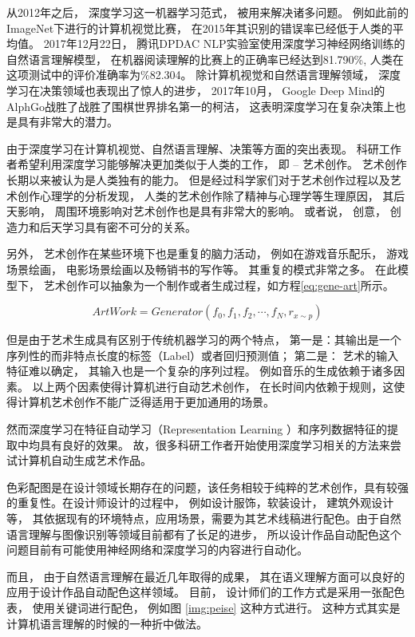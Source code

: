 从2012年之后， 深度学习这一机器学习范式， 被用来解决诸多问题。 例如此前的ImageNet下进行的计算机视觉比赛， 在2015年其识别的错误率已经低于人类的平均值。 2017年12月22日， 腾讯DPDAC NLP实验室使用深度学习神经网络训练的自然语言理解模型， 在机器阅读理解的比赛上的正确率已经达到81.790\%, 人类在这项测试中的评价准确率为\%82.304。 除计算机视觉和自然语言理解领域， 深度学习在决策领域也表现出了惊人的进步， 2017年10月， Google Deep Mind的AlphGo战胜了战胜了围棋世界排名第一的柯洁， 这表明深度学习在复杂决策上也是具有非常大的潜力。 

由于深度学习在计算机视觉、自然语言理解、决策等方面的突出表现。 科研工作者希望利用深度学习能够解决更加类似于人类的工作， 即 -- 艺术创作。 艺术创作长期以来被认为是人类独有的能力。 但是经过科学家们对于艺术创作过程以及艺术创作心理学的分析发现， 人类的艺术创作除了精神与心理学等生理原因， 其后天影响， 周围环境影响对艺术创作也是具有非常大的影响。 或者说， 创意， 创造力和后天学习具有密不可分的关系。 \cite{mq-zhanjian} \cite{adomavicius2005toward} \cite{gil2010state}

另外， 艺术创作在某些环境下也是重复的脑力活动， 例如在游戏音乐配乐， 游戏场景绘画， 电影场景绘画以及畅销书的写作等。 其重复的模式非常之多。 在此模型下， 艺术创作可以抽象为一个制作或者生成过程，如方程\eqref{eq:gene-art}所示。 

\begin{equation}\label{eq:gene-art}
ArtWork= Generator(f_0, f_1, f_2, \cdots, f_N, r_{x \sim p})
\end{equation} 

但是由于艺术生成具有区别于传统机器学习的两个特点， 第一是：其输出是一个序列性的而非特点长度的标签（Label）或者回归预测值； 第二是： 艺术的输入特征难以确定， 其输入也是一个复杂的序列过程。 例如音乐的生成依赖于诸多因素。 以上两个因素使得计算机进行自动艺术创作， 在长时间内依赖于规则，这使得计算机艺术创作不能广泛得适用于更加通用的场景。 

然而深度学习在特征自动学习（Representation Learning ）和序列数据特征的提取中均具有良好的效果。 故，很多科研工作者开始使用深度学习相关的方法来尝试计算机自动生成艺术作品。 

色彩配图是在设计领域长期存在的问题，该任务相较于纯粹的艺术创作，具有较强的重复性。在设计师设计的过程中， 例如设计服饰，软装设计， 建筑外观设计等， 其依据现有的环境特点，应用场景，需要为其艺术线稿进行配色。由于自然语言理解与图像识别等领域目前都有了长足的进步， 所以设计作品自动配色这个问题目前有可能使用神经网络和深度学习的内容进行自动化。 

而且， 由于自然语言理解在最近几年取得的成果， 其在语义理解方面可以良好的应用于设计作品自动配色这样领域。 目前， 设计师们的工作方式是采用一张配色表， 使用关键词进行配色， 例如图 \ref{img:peise} 这种方式进行。 这种方式其实是计算机语言理解的时候的一种折中做法。 


